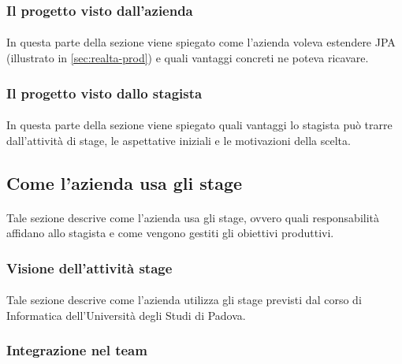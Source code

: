 \documentclass[
article,
10pt, %
oneside, %
BCOR5mm, %
]{scrartcl}
\begin{document}
\subsubsection{Il progetto visto dall'azienda}

\paragraph{} In questa parte della sezione viene spiegato come l'azienda
voleva estendere JPA (illustrato in \ref{sec:realta-prod}) e quali vantaggi
concreti ne poteva ricavare.

\subsubsection{Il progetto visto dallo stagista}

\paragraph{} In questa parte della sezione viene spiegato quali vantaggi lo
stagista può trarre dall'attività di stage, le aspettative iniziali e le
motivazioni della scelta.

\subsection{Come l'azienda usa gli stage}

\paragraph{} Tale sezione descrive come l'azienda usa gli stage, ovvero quali
responsabilità affidano allo stagista e come vengono gestiti gli obiettivi
produttivi.

\subsubsection{Visione dell'attività stage}

\paragraph{} Tale sezione descrive come l'azienda utilizza gli stage previsti
dal corso di Informatica dell'Università degli Studi di Padova.

\subsubsection{Integrazione nel team}
\end{document}
